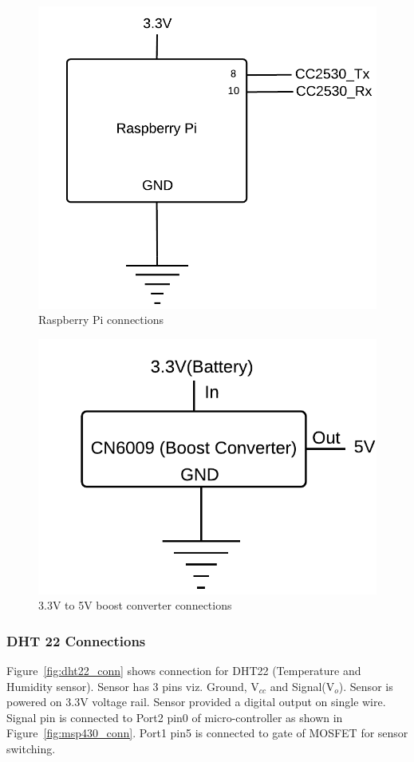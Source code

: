 \documentclass[a4paper,12pt]{article}
\begin{document}
\begin{figure}[!ht]
	\centering
	\includegraphics[scale=0.35]{pi.png}
	\caption{Raspberry Pi connections}
	\label{fig:pi_conn}
\end{figure}

\begin{figure}[!ht]
	\centering
	\includegraphics[scale=0.4]{boost.png}
	\caption{3.3V to 5V boost converter connections}
	\label{fig:boost_conn}
\end{figure}

\subsubsection{DHT 22 Connections}
Figure~\ref{fig:dht22_conn} shows connection for DHT22 (Temperature and Humidity sensor). Sensor has 3 pins viz. Ground, V$_{cc}$ and Signal(V$_o$). Sensor is powered on 3.3V voltage rail. Sensor provided a digital output on single wire. Signal pin is connected to Port2 pin0 of micro-controller as shown in Figure~\ref{fig:msp430_conn}. Port1 pin5 is connected to gate of MOSFET for sensor switching.
\end{document}
